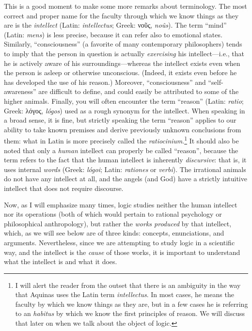 \documentclass[
  12pt,
]{memoir}
\begin{document}
This is a good moment to make some more remarks about terminology. The
most correct and proper name for the faculty through which we know
things as they are is the \emph{intellect} (Latin: \emph{intellectus};
Greek: νοῦς, \emph{noûs}). The term ``mind'' (Latin: \emph{mens}) is
less precise, because it can refer also to emotional states. Similarly,
``consciousness'' (a favorite of many contemporary philosophers) tends
to imply that the person in question is actually \emph{exercising} his
intellect---i.e., that he is actively aware of his
surroundings---whereas the intellect exists even when the person is
asleep or otherwise unconscious. (Indeed, it exists even before he has
developed the use of his reason.) Moreover, ``consciousness'' and
``self-awareness'' are difficult to define, and could easily be
attributed to some of the higher animals. Finally, you will often
encounter the term ``reason'' (Latin: \emph{ratio}; Greek: λόγος,
\emph{lógos}) used as a rough synonym for the intellect. When speaking
in a broad sense, it is fine, but strictly speaking the term ``reason''
applies to our ability to take known premises and derive previously
unknown conclusions from them: what in Latin is more precisely called
the \emph{ratiocinium}.\footnote{I will alert the reader from the outset
  that there is an ambiguity in the way that Aquinas uses the Latin term
  \emph{intellectus}. In most cases, he means the faculty by which we
  know things as they are, but in a few cases he is referring to an
  \emph{habitus} by which we know the first principles of reason. We
  will discuss that later on when we talk about the object of logic.} It
should also be noted that only a \emph{human} intellect can properly be
called ``reason'', because the term refers to the fact that the human
intellect is inherently \emph{discursive}: that is, it uses internal
\emph{words} (Greek: \emph{lógoi}; Latin: \emph{rationes} or
\emph{verbi}). The irrational animals do not have any intellect at all,
and the angels (and God) have a strictly intuitive intellect that does
not require discourse.

Now, as I will emphasize many times, logic studies neither the human
intellect nor its operations (both of which would pertain to rational
psychology or philosophical anthropology), but rather the \emph{works
produced} by that intellect, which, as we will see below are of three
kinds: concepts, enunciations, and arguments. Nevertheless, since we are
attempting to study logic in a scientific way, and the intellect is the
\emph{cause} of those works, it is important to understand what the
intellect is and what it does.
\end{document}
